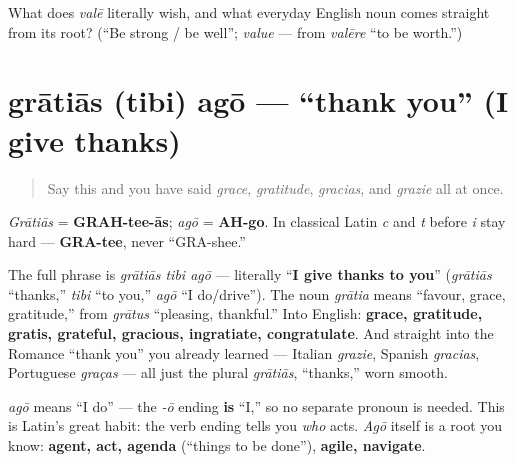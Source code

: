 \begin{tcolorbox}[breakable,colback=teal!4,colframe=teal!35!black,title={Before you move on}]
What does \emph{valē} literally wish, and what everyday English noun comes straight from its root? (\textquotedblleft{}Be strong / be well\textquotedblright{}; \emph{value} — from \emph{valēre} \textquotedblleft{}to be worth.\textquotedblright{})
\end{tcolorbox}
\section[grātiās (tibi) agō]{grātiās (tibi) agō — \textquotedblleft{}thank you\textquotedblright{} (I give thanks)}

\label{lesson:LA-C01-gratias}



\begin{quote}
Say this and you have said \emph{grace}, \emph{gratitude}, \emph{gracias}, and \emph{grazie} all at once.
\end{quote}

\begin{sounds}
\emph{Grātiās} = \textbf{GRAH-tee-ās}; \emph{agō} = \textbf{AH-go}. In classical Latin \emph{c} and \emph{t} before \emph{i} stay hard — \textbf{GRA-tee}, never \textquotedblleft{}GRA-shee.\textquotedblright{}
\end{sounds}

\begin{cousinweb}
The full phrase is \emph{grātiās tibi agō} — literally \textquotedblleft{}\textbf{I give thanks to you}\textquotedblright{} (\emph{grātiās} \textquotedblleft{}thanks,\textquotedblright{} \emph{tibi} \textquotedblleft{}to you,\textquotedblright{} \emph{agō} \textquotedblleft{}I do/drive\textquotedblright{}). The noun \emph{grātia} means \textquotedblleft{}favour, grace, gratitude,\textquotedblright{} from \emph{grātus} \textquotedblleft{}pleasing, thankful.\textquotedblright{} Into English: \textbf{grace, gratitude, gratis, grateful, gracious, ingratiate, congratulate}. And straight into the Romance \textquotedblleft{}thank you\textquotedblright{} you already learned — Italian \emph{grazie}, Spanish \emph{gracias}, Portuguese \emph{graças} — all just the plural \emph{grātiās}, \textquotedblleft{}thanks,\textquotedblright{} worn smooth.
\end{cousinweb}

\begin{grammarlens}[title={Grammar Lens}]
\emph{agō} means \textquotedblleft{}I do\textquotedblright{} — the \emph{-ō} ending \textbf{is} \textquotedblleft{}I,\textquotedblright{} so no separate pronoun is needed. This is Latin's great habit: the verb ending tells you \emph{who} acts. \emph{Agō} itself is a root you know: \textbf{agent, act, agenda} (\textquotedblleft{}things to be done\textquotedblright{}), \textbf{agile, navigate}.
\end{grammarlens}

